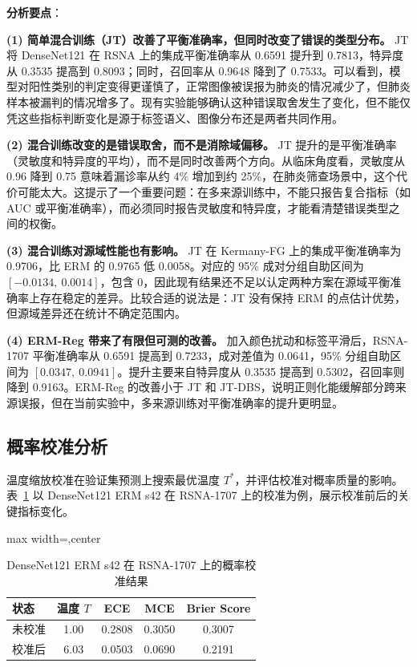 \documentclass[12pt,a4paper,UTF8,openany]{ctexbook}
\begin{document}
\textbf{分析要点}：

\textbf{(1) 简单混合训练（JT）改善了平衡准确率，但同时改变了错误的类型分布。} JT 将 DenseNet121 在 RSNA 上的集成平衡准确率从 0.6591 提升到 0.7813，特异度从 0.3535 提高到 0.8093；同时，召回率从 0.9648 降到了 0.7533。可以看到，模型对阳性类别的判定变得更谨慎了，正常图像被误报为肺炎的情况减少了，但肺炎样本被漏判的情况增多了。现有实验能够确认这种错误取舍发生了变化，但不能仅凭这些指标判断变化是源于标签语义、图像分布还是两者共同作用。

\textbf{(2) 混合训练改变的是错误取舍，而不是消除域偏移。} JT 提升的是平衡准确率（灵敏度和特异度的平均），而不是同时改善两个方向。从临床角度看，灵敏度从 0.96 降到 0.75 意味着漏诊率从约 4\% 增加到约 25\%，在肺炎筛查场景中，这个代价可能太大。这提示了一个重要问题：在多来源训练中，不能只报告复合指标（如 AUC 或平衡准确率），而必须同时报告灵敏度和特异度，才能看清楚错误类型之间的权衡。

\textbf{(3) 混合训练对源域性能也有影响。} JT 在 Kermany-FG 上的集成平衡准确率为 0.9706，比 ERM 的 0.9765 低 0.0058。对应的 95\% 成对分组自助区间为 $[-0.0134,\ 0.0014]$，包含 0，因此现有结果还不足以认定两种方案在源域平衡准确率上存在稳定的差异。比较合适的说法是：JT 没有保持 ERM 的点估计优势，但源域差异还在统计不确定范围内。

\textbf{(4) ERM-Reg 带来了有限但可测的改善。} 加入颜色扰动和标签平滑后，RSNA-1707 平衡准确率从 0.6591 提高到 0.7233，成对差值为 0.0641，95\% 分组自助区间为 $[0.0347,\ 0.0941]$。提升主要来自特异度从 0.3535 提高到 0.5302，召回率则降到 0.9163。ERM-Reg 的改善小于 JT 和 JT-DBS，说明正则化能缓解部分跨来源误报，但在当前实验中，多来源训练对平衡准确率的提升更明显。

\subsection{概率校准分析}

温度缩放校准在验证集预测上搜索最优温度 $T^*$，并评估校准对概率质量的影响。表~\ref{tab:calibration} 以 DenseNet121 ERM s42 在 RSNA-1707 上的校准为例，展示校准前后的关键指标变化。

\begin{table}[htbp]
\centering
\caption{DenseNet121 ERM s42 在 RSNA-1707 上的概率校准结果}
\label{tab:calibration}
\renewcommand{\arraystretch}{1.3}
\begin{adjustbox}{max width=\textwidth,center}
\begin{tabular}{lcccc}
\toprule
\textbf{状态} & \textbf{温度 $T$} & \textbf{ECE} & \textbf{MCE} & \textbf{Brier Score} \\
\midrule
未校准 & 1.00 & 0.2808 & 0.3050 & 0.3007 \\
校准后 & 6.03 & 0.0503 & 0.0690 & 0.2191 \\
\bottomrule
\end{tabular}
\end{adjustbox}
\end{table}
\end{document}
